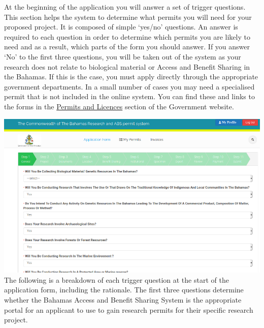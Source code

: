 \documentclass[
]{book}
\begin{document}
At the beginning of the application you will answer a set of trigger questions. This section helps the system to determine what permits you will need for your proposed project. It is composed of simple `yes/no' questions. An answer is required to each question in order to determine which permits you are likely to need and as a result, which parts of the form you should answer. If you answer `No' to the first three questions, you will be taken out of the system as your research does not relate to biological material or Access and Benefit Sharing in the Bahamas. If this is the case, you must apply directly through the appropriate government departments. In a small number of cases you may need a specialised permit that is not included in the online system. You can find these and links to the forms in the \href{https://www.bahamas.gov.bs/wps/portal/public/Permits\%20and\%20Licences/!ut/p/b1/vVTJcptAEP0Wf0DMDDAsR_adQSyS4KICYRCbBEIbfH1wkoOdqtiX2DOnqXndr_v1QiTElkiO6a0q00t1Oqbt6zthdhTQHEGgOUdDgAFG5NmCx-okhmgBxB8AaPDbXsO0oyzfWJUEYECF1qmVTIEAEBtiG8YTL43GXVWSoo9u2l5z0lCE6mBcqxJc2UBHV7KskB1R9x8rMj_aaMaeLEoWrsc-TsQqu9Y7xG_SslSDpKJi8g66m4bOPTcwG37nOeHl4dtZOSN0iPNm9BzRDTMYzSdn_2LmR8-_M2I2ZPOoy_tBtBgJXh6xp6tnVtVT_iQZQmtTuOCEK5VtXeHp6U_e4B9HAJ_pZhJJlXXP9333DJ4hBVlIQpZmWZZHCDKLLMmHHizyE8Cr8r8AH4QYLwD2jYdwDZbiAMEP4ApwLiRCYgvoXVBPvTE3s1_PK8qtTdPJTAM2AATRLXSjZnb53A2VAUIFWqFszEFtkKECXTeXvXztR6IgT7BS478JMRnyC6EEGStCSzPQX02oIcwtGrGhJyASaBh-NyH1rZJqHgZfnuG7pqFX_7-G7yaF4xmIWI7mOQbQNMcS6zpmeHnZHorhFv3-6vKyNRuBH1edWFoqXHUHZPXevcfJeeIbv403Ysl1OTvaut6RKd48hDKouou2Js9liR8Yj3Nl1pKoWYHtNWspXlnHsZnlahxrmTTArr1TFD8pVjJwbdgPQ4MO54a5zFlRWHoj41z7MRz7WrJug8EeCpKz6rAdgtsay0bXnovT_rxWffPaTHKrTdSh3kluvdMag12iorKhndJy2TCufupeiL6LbjYylcJ9e-mnn3zSVbg!/dl4/d5/L2dBISEvZ0FBIS9nQSEh/\#}{Permits and Licences} section of the Government website.

\includegraphics{images/trigger_questions.png}
The following is a breakdown of each trigger question at the start of the application form, including the rationale. The first three questions determine whether the Bahamas Access and Benefit Sharing System is the appropriate portal for an applicant to use to gain research permits for their specific research project.
\end{document}
